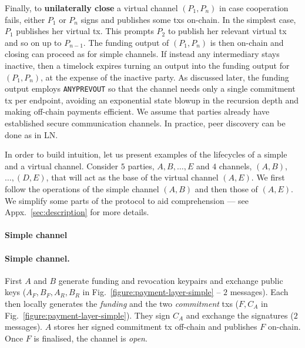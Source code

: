   Finally, to \textbf{unilaterally close} a virtual channel $(P_1, P_n)$
  in case cooperation fails,
  either $P_1$ or $P_n$ signs and publishes some
  txs on-chain. In the simplest case, $P_1$ publishes her virtual tx. This
  prompts $P_2$ to publish her relevant
  virtual tx and so on up to $P_{n-1}$. The
  funding output of $(P_1, P_n)$ is then on-chain and closing can
  proceed as for simple channels. If instead any intermediary stays inactive, then a timelock
  expires turning an output into the funding output for $(P_1,
  P_n)$, at
  the expense of the inactive party. As discussed later, the funding output
  employs \texttt{ANYPREVOUT} so that the channel needs only a
  single commitment tx per endpoint, avoiding an exponential state blowup in the
  recursion depth and making off-chain payments efficient. We assume that
  parties already have established secure communication channels.
  In practice, peer discovery can be done as in LN.

  In order to build intuition, let us present examples of the
  lifecycles of a simple and a virtual channel. Consider $5$ parties, $A, B,
  \dots, E$ and $4$ channels, $(A, B)$, $\dots,(D, E)$, that will act as
  the base of the virtual channel $(A, E)$. We first follow the operations of
  the simple channel $(A, B)$ and then those of $(A, E)$. We simplify some parts
  of the protocol to aid comprehension ---
  see Appx.~\ref{sec:description} for more details.

  \makeatletter%
    {\paragraph{Simple channel}}%
    {\paragraph{Simple channel.}}%
  \makeatother%
  First $A$ and $B$ generate funding and revocation keypairs and exchange
  public keys ($A_F, B_F, A_R, B_R$ in Fig.~\ref{figure:payment-layer-simple} --
  $2$ messages). Each then
  locally generates the \emph{funding} and the two \emph{commitment} txs
  ($F, C_A$ in Fig.~\ref{figure:payment-layer-simple}). They
  sign $C_A$ and exchange the
  signatures ($2$ messages). $A$ stores her
  signed commitment tx off-chain and publishes $F$ on-chain. Once $F$
  is finalised, the channel is \emph{open}.

